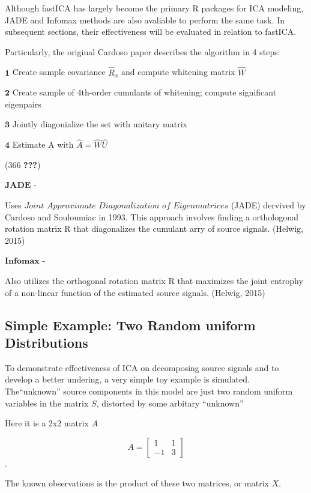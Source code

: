 \documentclass[12pt,twoside]{amherstthesis}
\begin{document}
  Although fastICA has largely become the primary R packages for ICA
  modeling, JADE and Infomax methods are also avaliable to perform the
  same task. In subsequent sections, their effectiveness will be evaluated
  in relation to fastICA.
  
  Particularly, the original Cardoso paper describes the algorithm in 4
  steps:
  
  \(\textbf{1}\) Create sample covariance \(\hat{R}_x\) and compute
  whitening matrix \(\hat{W}\)
  
  \(\textbf{2}\) Create sample of 4th-order cumulants of whitening;
  compute significant eigenpairs
  
  \(\textbf{3}\) Jointly diagonialize the set with unitary matrix
  
  \(\textbf{4}\) Estimate A with \(\hat{A} =\hat{W}\hat{U}\)
  
  (366 {\textbf{???}})
  
  \(\textbf{JADE}\) -
  
  Uses \(\textit{Joint Approximate Diagonalization of Eigenmatrices}\)
  (JADE) dervived by Cardoso and Souloumiac in 1993. This approach
  involves finding a orthologonal rotation matrix R that diagonalizes the
  cumulant arry of source signals. (Helwig, 2015)
  
  \(\textbf{Infomax}\) -
  
  Also utilizes the orthogonal rotation matrix R that maximizes the joint
  entrophy of a non-linear function of the estimated source signals.
  (Helwig, 2015)
  
  \subsection{Simple Example: Two Random uniform
  Distributions}\label{simple-example-two-random-uniform-distributions}
  
  To demonstrate effectiveness of ICA on decomposing source signals and to
  develop a better undering, a very simple toy example is simulated.
  The``unknown'' source components in this model are just two random
  uniform variables in the matrix \(S\), distorted by some arbitary
  ``unknown''
  
  Here it is a 2x2 matrix \(A\)
  
  \[A = \begin{bmatrix} 1 & 1 \\ -1 & 3  \end{bmatrix}\] .
  
  The known observations is the product of these two matrices, or matrix
  \(X\).
  
\end{document}
